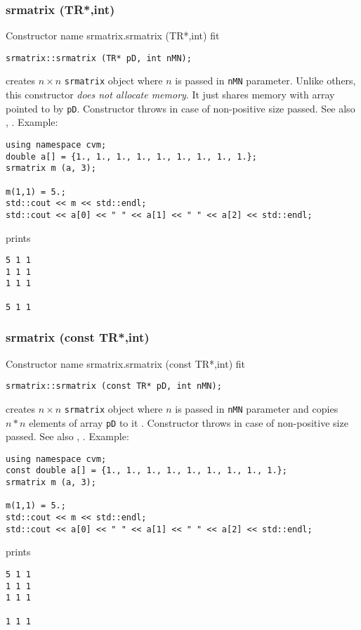 \subsubsection{srmatrix (TR*,int)}
Constructor%
\pdfdest name {srmatrix.srmatrix (TR*,int)} fit
\begin{verbatim}
srmatrix::srmatrix (TR* pD, int nMN);
\end{verbatim}
creates  $n\times n$ \verb"srmatrix" object where $n$ is passed in
\verb"nMN" parameter.
Unlike others, this constructor \textit{does not allocate  memory}.
It just shares  memory with  array pointed to by \verb"pD".
Constructor throws  
in case of non-positive size passed.
See also , 
.
Example:
\begin{Verbatim}
using namespace cvm;
double a[] = {1., 1., 1., 1., 1., 1., 1., 1., 1.};
srmatrix m (a, 3);

m(1,1) = 5.;
std::cout << m << std::endl;
std::cout << a[0] << " " << a[1] << " " << a[2] << std::endl;
\end{Verbatim}
prints
\begin{Verbatim}
5 1 1
1 1 1
1 1 1

5 1 1
\end{Verbatim}
\newpage


\subsubsection{srmatrix (const TR*,int)}
Constructor%
\pdfdest name {srmatrix.srmatrix (const TR*,int)} fit
\begin{verbatim}
srmatrix::srmatrix (const TR* pD, int nMN);
\end{verbatim}
creates  $n\times n$ \verb"srmatrix" object where $n$ is passed in
\verb"nMN" parameter
and copies $n*n$ elements of  array \verb"pD" to it .
Constructor throws  
in case of non-positive size passed.
See also , 
.
Example:
\begin{Verbatim}
using namespace cvm;
const double a[] = {1., 1., 1., 1., 1., 1., 1., 1., 1.};
srmatrix m (a, 3);

m(1,1) = 5.;
std::cout << m << std::endl;
std::cout << a[0] << " " << a[1] << " " << a[2] << std::endl;
\end{Verbatim}
prints
\begin{Verbatim}
5 1 1
1 1 1
1 1 1

1 1 1
\end{Verbatim}
\newpage




